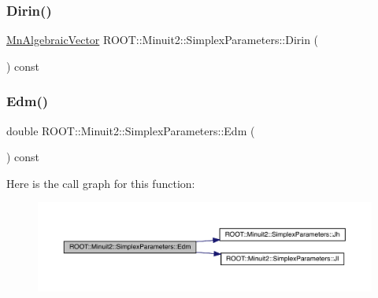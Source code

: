 \subsubsection{\texorpdfstring{Dirin()}{Dirin()}\hspace{0.1cm}{\footnotesize\ttfamily [3/3]}}
{\footnotesize\ttfamily \mbox{\hyperlink{namespaceROOT_1_1Minuit2_a62ed97730a1ca8d3fbaec64a19aa11c9}{Mn\+Algebraic\+Vector}} R\+O\+O\+T\+::\+Minuit2\+::\+Simplex\+Parameters\+::\+Dirin (\begin{DoxyParamCaption}{ }\end{DoxyParamCaption}) const}

\mbox{\label{classROOT_1_1Minuit2_1_1SimplexParameters_ad71f372dd3873cbf351dc8eddc3a9c9a}} 
\subsubsection{\texorpdfstring{Edm()}{Edm()}\hspace{0.1cm}{\footnotesize\ttfamily [1/3]}}
{\footnotesize\ttfamily double R\+O\+O\+T\+::\+Minuit2\+::\+Simplex\+Parameters\+::\+Edm (\begin{DoxyParamCaption}{ }\end{DoxyParamCaption}) const\hspace{0.3cm}{\ttfamily [inline]}}

Here is the call graph for this function\+:
\nopagebreak
\begin{figure}[H]
\begin{center}
\leavevmode
\includegraphics[width=350pt]{d7/da2/classROOT_1_1Minuit2_1_1SimplexParameters_ad71f372dd3873cbf351dc8eddc3a9c9a_cgraph}
\end{center}
\end{figure}
\mbox{\label{classROOT_1_1Minuit2_1_1SimplexParameters_ad71f372dd3873cbf351dc8eddc3a9c9a}} 
